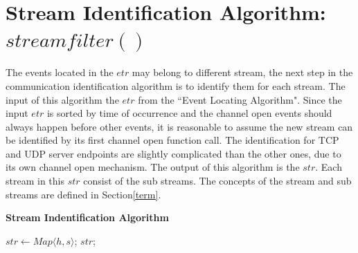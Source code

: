 \section{Stream Identification Algorithm: $streamfilter\left( \right)$}
The events located in the $etr$ may belong to different stream, the next step in the communication identification algorithm is to identify them for each stream. The input of this algorithm the $etr$ from the ``Event Locating Algorithm". Since the input  $etr$ is sorted by time of occurrence and the channel open events should always happen before other events, it is reasonable to assume the new stream can be identified by its first channel open function call. The identification for TCP and UDP server endpoints are slightly complicated than the other ones, due to its own channel open mechanism. The output of this algorithm is the $str$. Each stream in this $str$ consist of the sub streams. The concepts of the stream and sub streams are defined in Section\ref{term}. 

\begin{algorithm}[H]
\DontPrintSemicolon
\caption{{\bf Stream Indentification Algorithm} \label{endpointIdentAlg}}
$str \leftarrow Map \langle h, s\rangle$;\; 
\KwRet $str$;\;
\end{algorithm} 


